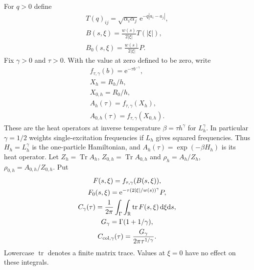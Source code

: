 \documentclass[aps,pra,reprint,superscriptaddress,longbibliography]{revtex4-2}
\newcommand{\Tr}{\operatorname{Tr}}
\newcommand{\dd}{\mathrm d}
\newcommand{\ee}{\mathrm e}
\begin{document}
For $q>0$ define
\begin{equation}
\begin{gathered}
 T(q)_{ij}=\sqrt{\alpha_i\alpha_j}\,\ee^{-q|a_i-a_j|},
 \\
 B(s,\xi)=\frac{w(s)}{2|\xi|}T(|\xi|),\\
 B_0(s,\xi)=\frac{w(s)}{2|\xi|}P.
 \label{sgt:geo:symbol}
\end{gathered}
\end{equation}
Fix $\gamma>0$ and $\tau>0$.  With the value at zero defined to be zero,
write
\[
\begin{gathered}
 f_{\tau,\gamma}(b)=\ee^{-\tau b^{-\gamma}},\\
 X_h=R_h/h,\\
 X_{0,h}=R_0/h,\\
 A_h(\tau)=f_{\tau,\gamma}(X_h),\\
 A_{0,h}(\tau)=f_{\tau,\gamma}(X_{0,h}).
\end{gathered}
\]
These are the heat operators at inverse temperature
$\beta=\tau h^\gamma$ for $L_h^\gamma$.  In particular $\gamma=1/2$
weights single-excitation frequencies if $L_h$ gives squared
frequencies.  Thus $H_h=L_h^\gamma$ is the one-particle Hamiltonian,
and $A_h(\tau)=\exp(-\beta H_h)$ is its heat operator.  Let
$Z_h=\Tr A_h$, $Z_{0,h}=\Tr A_{0,h}$ and
$\rho_h=A_h/Z_h$, $\rho_{0,h}=A_{0,h}/Z_{0,h}$.  Put
\begin{gather}
 F(s,\xi)=f_{\tau,\gamma}(B(s,\xi)),\\
 F_0(s,\xi)=\ee^{-\tau(2|\xi|/w(s))^\gamma}P,\notag\\
 C_\gamma(\tau)=\frac1{2\pi}\int_\Gamma\int_{\mathbb R}
                         \operatorname{tr}F(s,\xi)\,\dd\xi\dd s,\\
 G_\gamma=\Gamma(1+1/\gamma),\notag\\
 C_{\mathrm{col},\gamma}(\tau)=
             \frac{G_\gamma}{2\pi\tau^{1/\gamma}}.
 \label{sgt:geo:coefficients}
\end{gather}
Lowercase $\operatorname{tr}$ denotes a finite matrix trace.
Values at $\xi=0$ have no effect on these integrals.
\end{document}
